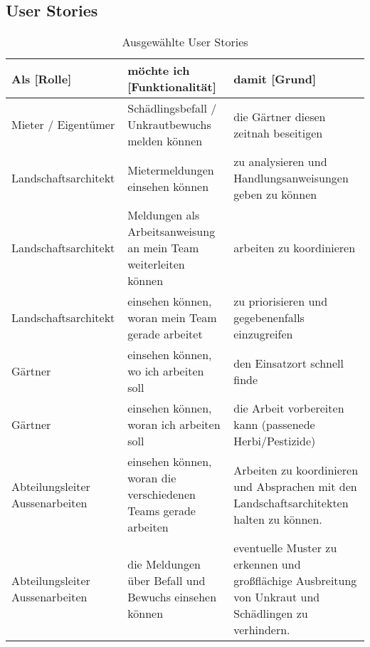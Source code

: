 \newpage

\subsection{User Stories}
\label{subsec:userStories}
\begin{table}[ht]
    \centering
    \begin{tabularx}{\textwidth}{|X|X|X|} 
        \hline
        Als [Rolle] & möchte ich [Funktionalität] & damit [Grund]\\
        \hline
        Mieter / Eigentümer & Schädlingsbefall / Unkrautbewuchs melden können & die Gärtner diesen zeitnah beseitigen\\
        \hline
        Landschaftsarchitekt & Mietermeldungen einsehen können & zu analysieren und Handlungsanweisungen geben zu können\\
        \hline
        Landschaftsarchitekt & Meldungen als Arbeitsanweisung an mein Team weiterleiten können & arbeiten zu koordinieren\\
        \hline
        Landschaftsarchitekt & einsehen können, woran mein Team gerade arbeitet & zu priorisieren und gegebenenfalls einzugreifen\\
        \hline
        Gärtner & einsehen können, wo ich arbeiten soll & den Einsatzort schnell finde \\
        \hline
        Gärtner & einsehen können, woran ich arbeiten soll & die Arbeit vorbereiten kann (passenede Herbi/Pestizide) \\
        \hline
        Abteilungsleiter Aussenarbeiten& einsehen können, woran die verschiedenen Teams gerade arbeiten & Arbeiten zu koordinieren und Absprachen mit den Landschaftsarchitekten halten zu können.\\
        \hline
        Abteilungsleiter Aussenarbeiten& die Meldungen über Befall und Bewuchs einsehen können & eventuelle Muster zu erkennen und großflächige Ausbreitung von Unkraut und Schädlingen zu verhindern.\\
        \hline
    \end{tabularx}
    \caption{Ausgewählte User Stories}
    \label{tab:userStories}
\end{table}